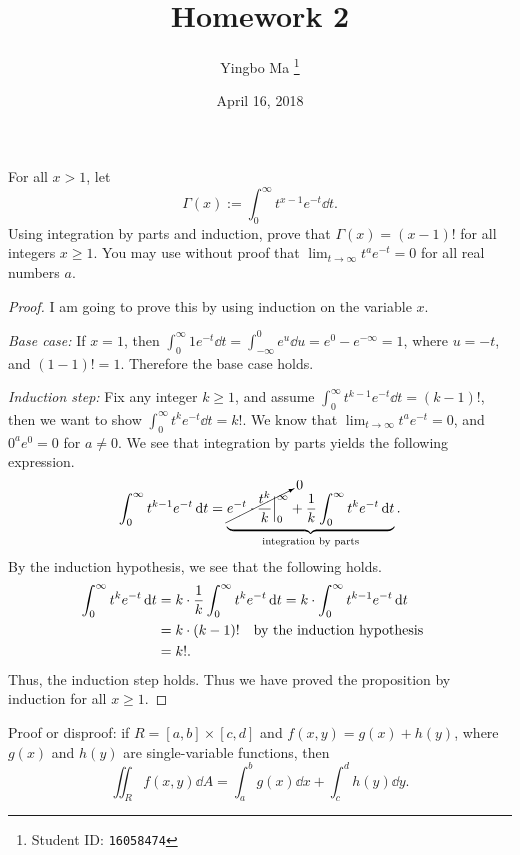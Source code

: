 \documentclass[8pt,twocolumn]{article}
\author{Yingbo Ma \thanks{Student ID: \tt{16058474}}}
\title{\vspace{-1.cm}Homework 2}
\date{April 16, 2018}
\begin{document}
\maketitle

\begin{Exercise}[number=10]
  For all $x>1$, let
  \[
    \Gamma(x) := \int_0^\infty t^{x-1}e^{-t}\dd{t}.
  \]
  Using integration by parts and induction, prove that $\Gamma(x)=(x-1)!$ for
  all integers $x\ge1$. You may use without proof that
  $\lim_{t\to\infty}t^ae^{-t}=0$ for all real numbers $a$.
\end{Exercise}

\begin{Answer}[number=10]
\begin{proof}
  I am going to prove this by using induction on the variable $x$.

  \emph{Base case:} If $x=1$, then
  $\int_0^\infty1e^{-t}\dd{t}=\int_{-\infty}^0e^u\dd{u} = e^0-e^{-\infty} = 1$,
  where $u=-t$, and $(1-1)!=1$. Therefore the base case holds.

  \emph{Induction step:} Fix any integer $k\ge 1$, and assume $\int_0^\infty
  t^{k-1}e^{-t}\dd{t}=(k-1)!$, then we want to show $\int_0^\infty
  t^{k}e^{-t}\dd{t}=k!$. We know that $\lim_{t\to\infty}t^ae^{-t}=0$, and
  $0^ae^0=0$ for $a\ne0$. We see that integration by parts yields the following
  expression.
  \begin{align*}
    \int_0^\infty t^{k-1}e^{-t}\dd{t} =
    \underbrace{\cancelto{0}{e^{-t}\cdot\frac{t^k}{k}\Big\vert_0^\infty} +
    \frac{1}{k}\int_0^\infty t^ke^{-t} \dd{t}}_\text{integration by parts}.
  \end{align*}
  By the induction hypothesis, we see that the following holds.
  \begin{align*}
    \int_0^\infty t^{k}e^{-t}\dd{t} &= k\cdot\frac{1}{k}\int_0^\infty t^ke^{-t}
    \dd{t}=k\cdot \int_0^\infty t^{k-1}e^{-t}\dd{t}\\
    &=k\cdot (k-1)!\qq{by the induction hypothesis}\\
    &=k!.
  \end{align*}
  Thus, the induction step holds. Thus we have proved the proposition by
  induction for all $x\ge 1$.
\end{proof}
\end{Answer}

\begin{Exercise}[number=11]
  Proof or disproof: if $R=[a,b]\times[c,d]$ and $f(x,y)=g(x)+h(y)$, where
  $g(x)$ and $h(y)$ are single-variable functions, then
  \[
    \iint_R f(x,y)\dd{A} = \int_a^bg(x)\dd{x} + \int_c^d h(y)\dd{y}.
  \]
\end{Exercise}
\end{document}
